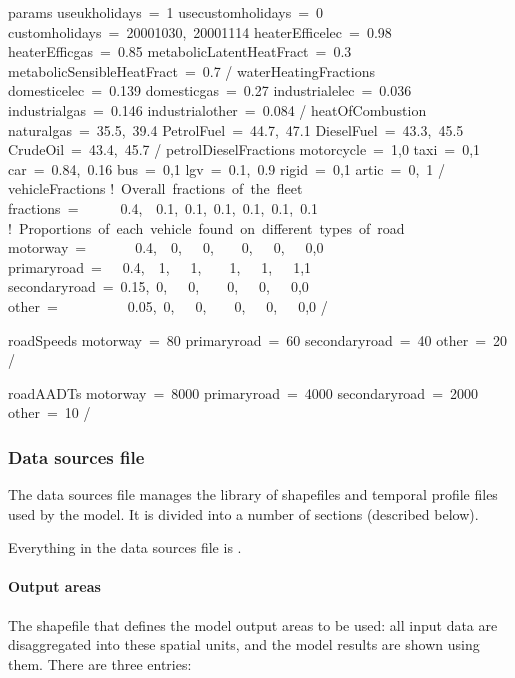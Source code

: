 \documentclass[letterpaper,10pt,english]{sphinxmanual}
\begin{document}
%
\begin{sphinxVerbatim}[commandchars=\\\{\}]
\PYGZam{}params
   use\PYGZus{}uk\PYGZus{}holidays = 1
   use\PYGZus{}custom\PYGZus{}holidays = 0
   custom\PYGZus{}holidays = \PYGZsq{}2000\PYGZhy{}10\PYGZhy{}30\PYGZsq{}, \PYGZsq{}2000\PYGZhy{}11\PYGZhy{}14
   heaterEffic\PYGZus{}elec = 0.98
   heaterEffic\PYGZus{}gas = 0.85
   metabolicLatentHeatFract = 0.3
   metabolicSensibleHeatFract = 0.7
/
\PYGZam{}waterHeatingFractions
   domestic\PYGZus{}elec = 0.139
   domestic\PYGZus{}gas = 0.27
   industrial\PYGZus{}elec = 0.036
   industrial\PYGZus{}gas = 0.146
   industrial\PYGZus{}other = 0.084
/
\PYGZam{}heatOfCombustion
   natural\PYGZus{}gas = 35.5, 39.4
   Petrol\PYGZus{}Fuel = 44.7, 47.1
   Diesel\PYGZus{}Fuel = 43.3, 45.5
   Crude\PYGZus{}Oil = 43.4, 45.7
/
\PYGZam{}petrolDieselFractions
   motorcycle = 1,0
   taxi = 0,1
   car = 0.84, 0.16
   bus = 0,1
   lgv = 0.1, 0.9
   rigid = 0,1
   artic = 0, 1
/
\PYGZam{}vehicleFractions
   ! Overall fractions of the fleet
   fractions =      0.4,  0.1, 0.1, 0.1, 0.1, 0.1, 0.1
   ! Proportions of each vehicle found on different types of road
   motorway =       0.4,  0,   0,    0,   0,   0,0
   primary\PYGZus{}road =   0.4,  1,   1,    1,   1,   1,1
   secondary\PYGZus{}road = 0.15, 0,   0,    0,   0,   0,0
   other =          0.05, 0,   0,    0,   0,   0,0
/

\PYGZam{}roadSpeeds
   motorway = 80
   primary\PYGZus{}road = 60
   secondary\PYGZus{}road = 40
   other = 20
/

\PYGZam{}roadAADTs
   motorway = 8000
   primary\PYGZus{}road = 4000
   secondary\PYGZus{}road = 2000
   other = 10
/
\end{sphinxVerbatim}


\subsubsection{Data sources file}
\label{\detokenize{OtherManuals/GQF_Manual:data-sources-file}}
The data sources file manages the library of shapefiles and temporal
profile files used by the model. It is divided into a number of sections
(described below).

Everything in the data sources file is .


\paragraph{Output areas}
\label{\detokenize{OtherManuals/GQF_Manual:output-areas}}
The shapefile that defines the model output areas to be used: all input
data are disaggregated into these spatial units, and the model results
are shown using them. There are three entries:
\end{document}
